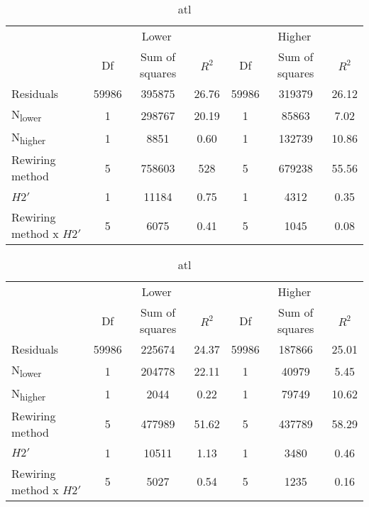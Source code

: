 \documentclass[12pt,a4paper]{article}
\begin{document}

\begin{table}
\ContinuedFloat
    \begin{subtable}{\linewidth}
    \caption{atL}
    \centering
\begin{tabularx}{\linewidth}{@{} X *6{c} @{}}
\toprule
  & \multicolumn{3}{c}{Lower} & \multicolumn{3}{c}{Higher} \\ \cmidrule(l){2-4} \cmidrule(l){5-7}
  						& Df		& Sum of squares	& $R^2$	& Df 	& Sum of squares	& $R^2$ \\ \midrule
Residuals 				& 59986 & 395875		& 26.76	& 59986 & 319379 		& 26.12   \\
N\textsubscript{lower} 	& 1 		& 298767 		& 20.19 	& 1		& 85863 		& 7.02  \\
N\textsubscript{higher} 	& 1 		& 8851 			& 0.60	& 1 		& 132739			& 10.86  \\
Rewiring method 			& 5 		& 758603			& 528 	& 5 		& 679238			& 55.56  \\
$H2'$ 					& 1 		& 11184 			& 0.75 	& 1 		& 4312			& 0.35 \\
Rewiring method x $H2'$ 	& 5 		& 6075 			& 0.41 	& 5 		& 1045			& 0.08  \\ \bottomrule
\end{tabularx}
\end{subtable}

\medskip
    \begin{subtable}{\linewidth}
    \caption{atl}
    \centering
\begin{tabularx}{\linewidth}{@{} X *6{c} @{}}
\toprule
  & \multicolumn{3}{c}{Lower} & \multicolumn{3}{c}{Higher} \\ \cmidrule(l){2-4} \cmidrule(l){5-7}
  						& Df		& Sum of squares	& $R^2$	& Df 	& Sum of squares	& $R^2$ \\ \midrule
Residuals 				& 59986 & 225674			& 24.37	& 59986 & 187866		& 25.01   \\
N\textsubscript{lower} 	& 1 		& 204778 			& 22.11 	& 1		& 40979			& 5.45  \\
N\textsubscript{higher} 	& 1 		& 2044 			& 0.22	& 1 		& 79749 		& 10.62  \\
Rewiring method 			& 5 		& 477989 		& 51.62 	& 5 		& 437789			& 58.29  \\
$H2'$ 					& 1 		& 10511 			& 1.13 	& 1 		& 3480			& 0.46 \\
Rewiring method x $H2'$ 	& 5 		& 5027 			& 0.54 	& 5 		& 1235			&  0.16  \\ \bottomrule
\end{tabularx}
\end{subtable}


\end{table}
\end{document}
